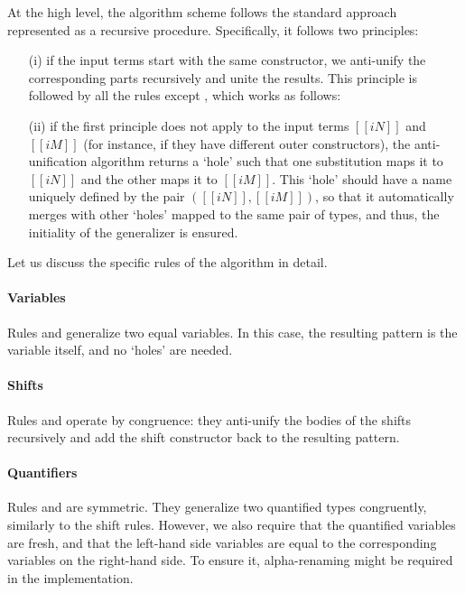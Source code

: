 At the high level, the algorithm scheme follows
the standard approach \cite{plotkin1970:generalization}
represented as a recursive procedure. Specifically, it follows two principles:
\begin{enumerate}
  \item[(i)] if the input terms start with the same constructor,
    we anti-unify the corresponding parts recursively and 
    unite the results. This principle is followed by 
    all the rules except ,
    which works as follows:
  \item[(ii)] if the first principle does not apply to the input terms $[[iN]]$
    and $[[iM]]$ (for instance, if they have different outer constructors), the
    anti-unification algorithm returns a `hole' such that one substitution maps
    it to $[[iN]]$ and the other maps it to $[[iM]]$. This `hole'
    should have a name uniquely defined by the pair $([[iN]], [[iM]])$, so
    that it automatically merges with other `holes' mapped to the same
    pair of types, and thus, the initiality of the generalizer is ensured. 
\end{enumerate}

Let us discuss the specific rules of the algorithm in detail.

\paragraph*{Variables} 
  Rules  and
   generalize two equal variables.
  In this case, the resulting pattern is the variable itself,
  and no `holes' are needed.

\paragraph*{Shifts} 
  Rules  and
   operate by congruence:
  they anti-unify the bodies of the shifts recursively and add
  the shift constructor back to the resulting pattern.

\paragraph*{Quantifiers}
  Rules  and
   are symmetric. 
  They generalize two quantified types congruently, 
  similarly to the shift rules. 
  However, we also require that the quantified variables
  are fresh, and that the left-hand side variables are 
  equal to the corresponding variables on the right-hand side.
  To ensure it, alpha-renaming might be required in the
  implementation.


